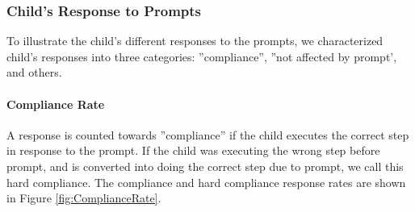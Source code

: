 \subsubsection{Child's Response to Prompts}
To illustrate the child's different responses to the prompts, we characterized child's responses into three categories: ''compliance'', ''not affected by prompt', and others.

\paragraph{Compliance Rate}
A response is counted towards ''compliance'' if the child executes the correct step in response to the prompt.  If the child was executing the wrong step before prompt, and is converted into doing the correct step due to prompt, we call this hard compliance.  The compliance and hard compliance response rates are shown in Figure \ref{fig:ComplianceRate}.

